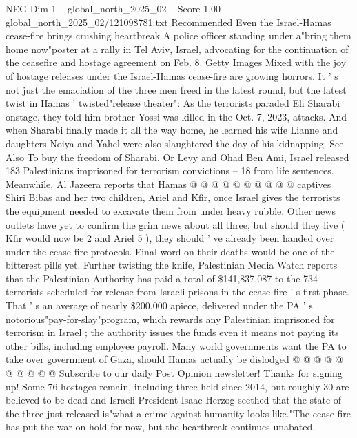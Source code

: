 \begin{textsample}{NEG Dim 1 – global\_north\_2025\_02 – Score 1.00 – global\_north\_2025\_02/121098781.txt}  \label{ex:f1_neg_011}
Recommended Even the Israel-Hamas cease-fire brings crushing heartbreak A police officer standing under a"bring them home now"poster at a rally in Tel Aviv, Israel, advocating for the continuation of the ceasefire and hostage agreement on Feb. 8.
Getty Images Mixed with the joy of hostage releases under the Israel-Hamas cease-fire are growing horrors.
It ' s not just the emaciation of the three men freed in the latest round, but the latest twist in Hamas ' twisted"release theater": As the terrorists paraded Eli Sharabi onstage, they told him brother Yossi was killed in the Oct. 7, 2023, attacks.
And when Sharabi finally made it all the way home, he learned his wife Lianne and daughters Noiya and Yahel were also slaughtered the day of his kidnapping.
See Also To buy the freedom of Sharabi, Or Levy and Ohad Ben Ami, Israel released 183 Palestinians imprisoned for terrorism convictions -- 18 from life sentences.
Meanwhile, Al Jazeera reports that Hamas @ @ @ @ @ @ @ @ @ @ captives Shiri Bibas and her two children, Ariel and Kfir, once Israel gives the terrorists the equipment needed to excavate them from under heavy rubble.
Other news outlets have yet to confirm the grim news about all three, but should they live ( Kfir would now be 2 and Ariel 5 ), they should ' ve already been handed over under the cease-fire protocols.
Final word on their deaths would be one of the bitterest pills yet.
Further twisting the knife, Palestinian Media Watch reports that the Palestinian Authority has paid a total of \$141,837,087 to the 734 terrorists scheduled for release from Israeli prisons in the cease-fire ' s first phase.
That ' s an average of nearly \$200,000 apiece, delivered under the PA ' s notorious"pay-for-slay"program, which rewards any Palestinian imprisoned for terrorism in Israel ; the authority issues the funds even it means not paying its other bills, including employee payroll.
Many world governments want the PA to take over government of Gaza, should Hamas actually be dislodged @ @ @ @ @ @ @ @ @ @ Subscribe to our daily Post Opinion newsletter!
Thanks for signing up!
Some 76 hostages remain, including three held since 2014, but roughly 30 are believed to be dead and Israeli President Isaac Herzog seethed that the state of the three just released is"what a crime against humanity looks like."The cease-fire has put the war on hold for now, but the heartbreak continues unabated.

\end{textsample}

